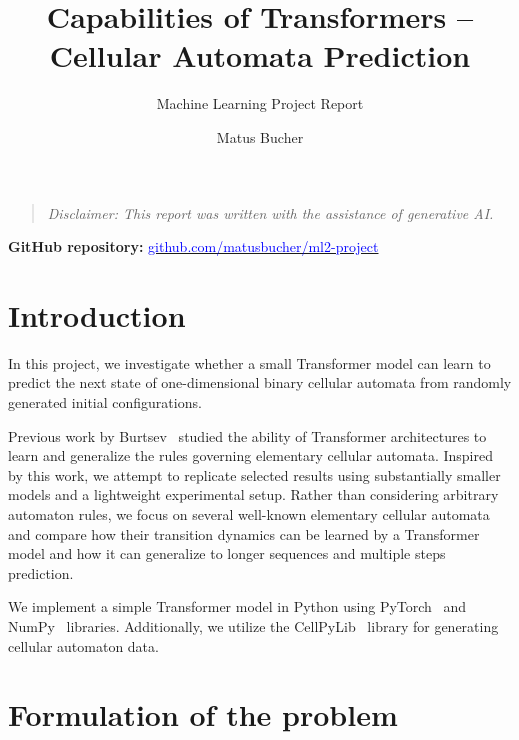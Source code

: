\documentclass[runningheads]{llncs}
\begin{document}
\title{Capabilities of Transformers -- Cellular Automata Prediction}
\subtitle{Machine Learning Project Report}
\author{Matus Bucher \\ }

\maketitle


\begin{quote}
\small\textit{Disclaimer: This report was written with the assistance of generative AI.}
\end{quote}


\textbf{GitHub repository:} \href{https://github.com/matusbucher/ml2-project}{\textcolor{blue}{github.com/matusbucher/ml2-project}}


\section{Introduction}
\label{sec:intro}

In this project, we investigate whether a small Transformer model can learn to predict the next state of one-dimensional binary cellular automata from randomly generated initial configurations.

Previous work by Burtsev~\cite{burtsev} studied the ability of Transformer architectures to learn and generalize the rules governing elementary cellular automata. Inspired by this work, we attempt to replicate selected results using substantially smaller models and a lightweight experimental setup. Rather than considering arbitrary automaton rules, we focus on several well-known elementary cellular automata and compare how their transition dynamics can be learned by a Transformer model and how it can generalize to longer sequences and multiple steps prediction.

We implement a simple Transformer model in Python using PyTorch~\cite{pytorch} and NumPy~\cite{numpy} libraries. Additionally, we utilize the CellPyLib~\cite{cellpylib} library for generating cellular automaton data.


\section{Formulation of the problem}
\label{sec:problem}
\end{document}
